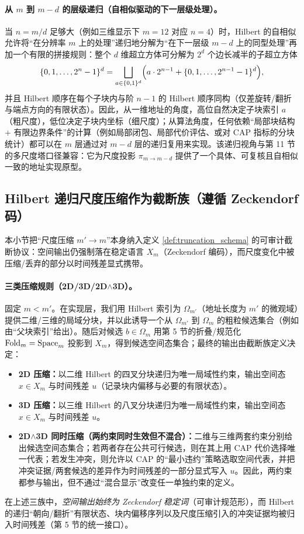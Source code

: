\paragraph{从 $m$ 到 $m-d$ 的层级递归（自相似驱动的下一层级处理）。}
当 $n=m/d$ 足够大（例如三维显示下 $m=12$ 对应 $n=4$）时，Hilbert 的自相似允许将“在分辨率 $m$ 上的处理”递归地分解为“在下一层级 $m-d$ 上的同型处理”再加一个有限的拼接规则：整个 $d$ 维超立方体可分解为 $2^d$ 个边长减半的子超立方体
$$
\{0,1,\dots,2^n-1\}^d=\bigsqcup_{a\in\{0,1\}^d}\Bigl(a\cdot 2^{n-1}+\{0,1,\dots,2^{n-1}-1\}^d\Bigr),
$$
并且 Hilbert 顺序在每个子块内与阶 $n-1$ 的 Hilbert 顺序同构（仅差旋转/翻折与端点方向的有限状态）。因此，从一维地址的角度，高位自然决定子块索引 $a$（粗尺度），低位决定子块内坐标（细尺度）；从算法角度，任何依赖“局部块结构 + 有限边界条件”的计算（例如局部闭包、局部代价评估、或对 CAP 指标的分块统计）都可以在 $m$ 层通过对 $m-d$ 层的递归复用来实现。该递归视角与第 11 节的多尺度塔口径兼容：它为尺度投影 $\pi_{m\to m-d}$ 提供了一个具体、可复核且自相似一致的地址实现原型。

\subsection{Hilbert 递归尺度压缩作为截断族（遵循 Zeckendorf 码）}
\AuditTag 本小节把“尺度压缩 $m'\to m$”本身纳入定义 \ref{def:truncation_schema} 的可审计截断协议：空间输出仍强制落在稳定语言 $X_m$（Zeckendorf 编码），而尺度变化中被压缩/丢弃的部分以时间残差显式携带。

\paragraph{三类压缩规则（2D/3D/2D$\wedge$3D）。}
固定 $m<m'$。在实现层，我们用 Hilbert 索引为 $\Omega_{m'}$（地址长度为 $m'$ 的微观域）提供二维/三维的局域分块，并以此诱导一个从 $\Omega_{m'}$ 到 $\Omega_m$ 的粗粒候选集合（例如由“父块索引”给出）。随后对候选 $b\in\Omega_m$ 用第 5 节的折叠/规范化 $\mathrm{Fold}_m=\mathrm{Space}_m$ 投影到 $X_m$，得到候选空间态集合；最终的输出由截断族定义决定：
\begin{itemize}
  \item \textbf{2D 压缩：}以二维 Hilbert 的四叉分块递归为唯一局域性约束，输出空间态 $x\in X_m$ 与时间残差 $u$（记录块内偏移与必要的有限状态）。
  \item \textbf{3D 压缩：}以三维 Hilbert 的八叉分块递归为唯一局域性约束，输出空间态 $x\in X_m$ 与时间残差 $u$。
  \item \textbf{2D$\wedge$3D 同时压缩（两约束同时生效但不混合）：}二维与三维两套约束分别给出候选空间态集合；若两者存在公共可行候选，则在其上用 CAP 代价选择唯一代表；若发生冲突，则允许以 CAP 的“最小违约”策略选取空间代表，并把冲突证据/两套候选的差异作为时间残差的一部分显式写入 $u$。因此，两约束都参与输出，但不通过“混合显示”改变任一单独约束的定义。
\end{itemize}
在上述三族中，\emph{空间输出始终为 Zeckendorf 稳定词}（可审计规范形），而 Hilbert 的递归“朝向/翻折”有限状态、块内偏移序列以及尺度压缩引入的冲突证据均被归入时间残差（第 5 节的统一接口）。
